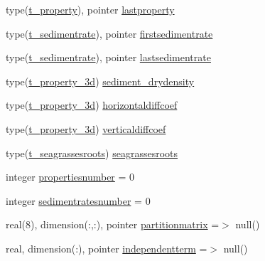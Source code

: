 \begin{DoxyCompactItemize}
\item 
type(\mbox{\hyperlink{structmodulesedimentproperties_1_1t__property}{t\+\_\+property}}), pointer \mbox{\hyperlink{structmodulesedimentproperties_1_1t__sedimentproperties_a78f60e5de7c857d6ac8df397748dab5f}{lastproperty}}
\item 
type(\mbox{\hyperlink{structmodulesedimentproperties_1_1t__sedimentrate}{t\+\_\+sedimentrate}}), pointer \mbox{\hyperlink{structmodulesedimentproperties_1_1t__sedimentproperties_a5e88d687080f4274da00e174b8a43de8}{firstsedimentrate}}
\item 
type(\mbox{\hyperlink{structmodulesedimentproperties_1_1t__sedimentrate}{t\+\_\+sedimentrate}}), pointer \mbox{\hyperlink{structmodulesedimentproperties_1_1t__sedimentproperties_a4c58b6f525a0428daeacd4dd7fa3880d}{lastsedimentrate}}
\item 
type(\mbox{\hyperlink{structmodulesedimentproperties_1_1t__property__3d}{t\+\_\+property\+\_\+3d}}) \mbox{\hyperlink{structmodulesedimentproperties_1_1t__sedimentproperties_af9c7ef34c5155684a0dff75e40ebdfd7}{sediment\+\_\+drydensity}}
\item 
type(\mbox{\hyperlink{structmodulesedimentproperties_1_1t__property__3d}{t\+\_\+property\+\_\+3d}}) \mbox{\hyperlink{structmodulesedimentproperties_1_1t__sedimentproperties_a9123b308f0010d21ead98d532997eb72}{horizontaldiffcoef}}
\item 
type(\mbox{\hyperlink{structmodulesedimentproperties_1_1t__property__3d}{t\+\_\+property\+\_\+3d}}) \mbox{\hyperlink{structmodulesedimentproperties_1_1t__sedimentproperties_a921ea7c88142977a4b5a248935675976}{verticaldiffcoef}}
\item 
type(\mbox{\hyperlink{structmodulesedimentproperties_1_1t__seagrassesroots}{t\+\_\+seagrassesroots}}) \mbox{\hyperlink{structmodulesedimentproperties_1_1t__sedimentproperties_ae085c9f4f0d828622566432d7fb35cf0}{seagrassesroots}}
\item 
integer \mbox{\hyperlink{structmodulesedimentproperties_1_1t__sedimentproperties_a6f9b9d1dd91b75a2468a48d6137be4b1}{propertiesnumber}} = 0
\item 
integer \mbox{\hyperlink{structmodulesedimentproperties_1_1t__sedimentproperties_a436b46eb687eba8e864cf9899add95c1}{sedimentratesnumber}} = 0
\item 
real(8), dimension(\+:,\+:), pointer \mbox{\hyperlink{structmodulesedimentproperties_1_1t__sedimentproperties_a4355437da14ee937bd2d9726d014567d}{partitionmatrix}} =$>$ null()
\item 
real, dimension(\+:), pointer \mbox{\hyperlink{structmodulesedimentproperties_1_1t__sedimentproperties_a720405bdd4cf0d734285c1aafe657606}{independentterm}} =$>$ null()

\end{DoxyCompactItemize}
